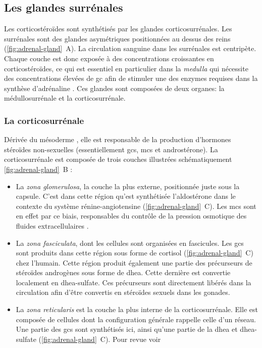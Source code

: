 \documentclass[../main.tex]{subfiles}
\begin{document}

\subsection{Les glandes surrénales}
	Les corticostéroïdes sont synthétisés par les glandes corticosurrénales.
	Les surrénales sont des glandes asymétriques positionnées au dessus des reins (\autoref{fig:adrenal-gland}~A).
	La circulation sanguine dans les surrénales est centripète.
	Chaque couche est donc exposée à des concentrations croissantes en corticostéroïdes, ce qui est essentiel en particulier dans la \textit{medulla} qui nécessite des concentrations élevées de \gls{gc} afin de stimuler une des enzymes requises dans la synthèse d'adrénaline \citep{Nussey2001}.
	Ces glandes sont composées de deux organes: la médullosurrénale et la corticosurrénale.

	

	\subsubsection{La corticosurrénale}
		Dérivée du mésoderme \citep{Hammer2005}, elle est responsable de la production d'hormones stéroïdes non-sexuelles (essentiellement \glspl{gc}, \glspl{mc} et androstérone).
		La corticosurrénale est composée de trois couches illustrées schématiquement \autoref{fig:adrenal-gland}~B \citep{Charlton1990,Parker1993} :
		\begin{itemize}
			\item
				La \textit{zona glomerulosa}, la couche la plus externe, positionnée juste sous la capsule.
				C'est dans cette région qu'est synthétisée l'aldostérone dans le contexte du système rénine-angiotensine (\autoref{fig:adrenal-gland}~C).
				Les \glspl{mc} sont en effet par ce biais, responsables du contrôle de la pression osmotique des fluides extracellulaires \citep{Feraco2013}.
			\item
				La \textit{zona fasciculata}, dont les cellules sont organisées en fascicules. Les \glspl{gc} sont produits dans cette région sous forme de cortisol (\autoref{fig:adrenal-gland}~C) chez l'humain.
				Cette région produit également une partie des précurseurs de stéroïdes androgènes sous forme de \gls{dhea}.
				Cette dernière est convertie localement en \gls{dhea}-sulfate.
				Ces précurseurs sont directement libérés dans la circulation afin d'être convertis en stéroïdes sexuels dans les gonades.
			\item
				La \textit{zona reticularis} est la couche la plus interne de la corticosurrénale.
				Elle est composée de cellules dont la configuration générale rappelle celle d'un réseau.
				Une partie des \glspl{gc} sont synthétisés ici, ainsi qu'une partie de la \gls{dhea} et \gls{dhea}-sulfate (\autoref{fig:adrenal-gland}~C).
				Pour revue voir \citep{McKay2003a}
		\end{itemize}
\end{document}
